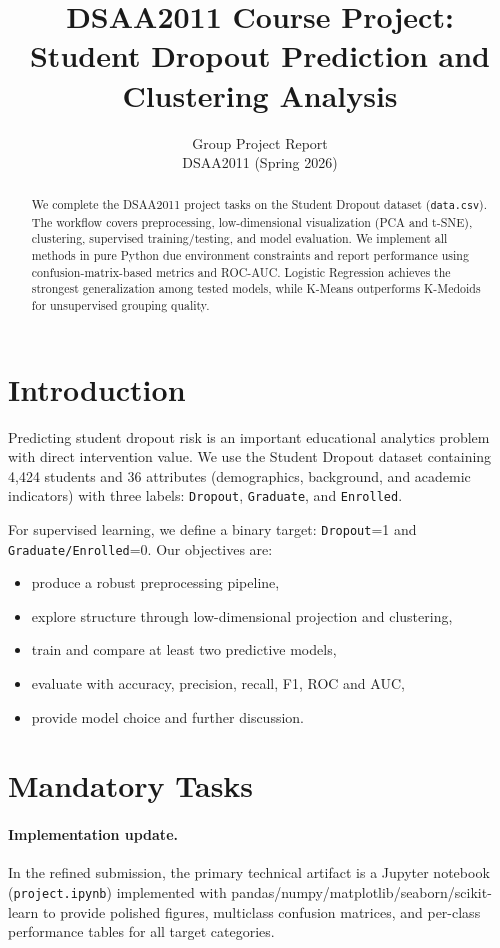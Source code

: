 \documentclass{article}
\title{DSAA2011 Course Project: Student Dropout Prediction and Clustering Analysis}
\author{Group Project Report \\
DSAA2011 (Spring 2026)}
\begin{document}
\maketitle

\begin{abstract}
We complete the DSAA2011 project tasks on the Student Dropout dataset (\texttt{data.csv}). The workflow covers preprocessing, low-dimensional visualization (PCA and t-SNE), clustering, supervised training/testing, and model evaluation. We implement all methods in pure Python due environment constraints and report performance using confusion-matrix-based metrics and ROC-AUC. Logistic Regression achieves the strongest generalization among tested models, while K-Means outperforms K-Medoids for unsupervised grouping quality.
\end{abstract}

\section{Introduction}
Predicting student dropout risk is an important educational analytics problem with direct intervention value. We use the Student Dropout dataset containing 4,424 students and 36 attributes (demographics, background, and academic indicators) with three labels: \texttt{Dropout}, \texttt{Graduate}, and \texttt{Enrolled}. 

For supervised learning, we define a binary target: \texttt{Dropout}=1 and \texttt{Graduate/Enrolled}=0. Our objectives are:
\begin{itemize}
    \item produce a robust preprocessing pipeline,
    \item explore structure through low-dimensional projection and clustering,
    \item train and compare at least two predictive models,
    \item evaluate with accuracy, precision, recall, F1, ROC and AUC,
    \item provide model choice and further discussion.
\end{itemize}

\section{Mandatory Tasks}
\paragraph{Implementation update.} In the refined submission, the primary technical artifact is a Jupyter notebook (\texttt{project.ipynb}) implemented with pandas/numpy/matplotlib/seaborn/scikit-learn to provide polished figures, multiclass confusion matrices, and per-class performance tables for all target categories.
\end{document}
